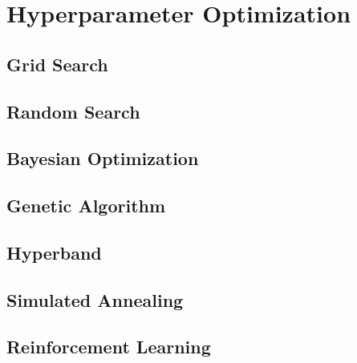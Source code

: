 \section{Hyperparameter Optimization}

\subsection{Grid Search}

\subsection{Random Search}

\subsection{Bayesian Optimization}

\subsection{Genetic Algorithm}

\subsection{Hyperband}

\subsection{Simulated Annealing}

\subsection{Reinforcement Learning}
